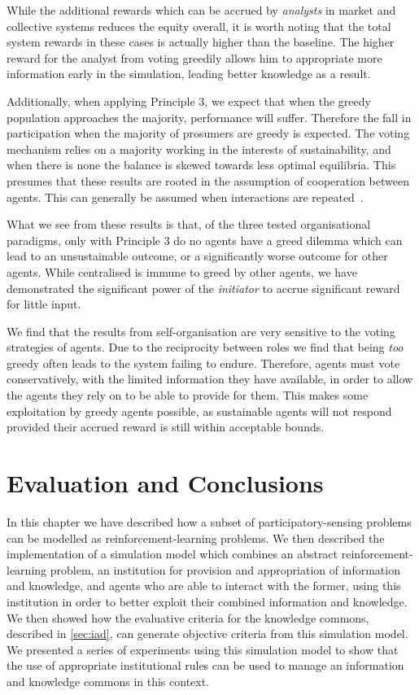 While the additional rewards which can be accrued by \emph{analysts} in market
and collective systems reduces the equity overall, it is worth noting
that the total system rewards in these cases is actually higher than the
baseline. The higher reward for the analyst from voting greedily allows him to
appropriate more information early in the simulation, leading better knowledge
as a result.

Additionally, when applying Principle 3, we expect that when the greedy
population approaches the majority, performance will suffer. Therefore the
fall in participation when the majority of prosumers are greedy is
expected. The voting mechanism relies on a majority working in the interests
of sustainability, and when there is none the balance is skewed towards less
optimal equilibria. This presumes that these results are rooted in the assumption
of cooperation between agents. This can generally be assumed when interactions
are repeated~\citep{Axelrod1984}.

What we see from these results is that, of the three tested organisational
paradigms, only with Principle 3 do no agents have a greed
dilemma which can lead to an unsustainable outcome, or a significantly worse
outcome for other agents. While centralised is immune to greed by
other agents, we have demonstrated the significant power of the
\emph{initiator} to accrue significant reward for little input.

We find that the results from self-organisation are very sensitive to the
voting strategies of agents. Due to the reciprocity between roles we find that
being \emph{too} greedy often leads to the system failing to endure. Therefore,
agents must vote conservatively, with the limited information they have
available, in order to allow the agents they rely on to be able to provide for
them. This makes some exploitation by greedy agents possible, as
sustainable agents will not respond provided their accrued reward is still
within acceptable bounds.

\section{Evaluation and Conclusions}

In this chapter we have described how a subset of participatory-sensing
problems can be modelled as reinforcement-learning problems. We then described
the implementation of a simulation model which combines an abstract
reinforcement-learning problem, an institution for provision and appropriation
of information and knowledge, and agents who are able to interact with the
former, using this institution in order to better exploit their combined
information and knowledge. We then showed how the evaluative criteria for the
knowledge commons, described in \autoref{sec:iad}, can generate objective
criteria from this simulation model. We presented a series of experiments
using this simulation model to show that the use of appropriate institutional
rules can be used to manage an information and knowledge commons in this
context.

